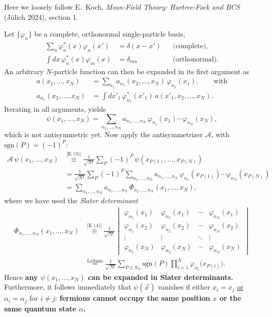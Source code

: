 \documentclass[../../main.tex]{subfiles}
\begin{document}
Here we loosely follow E.\ Koch, \emph{Mean-Field Theory: Hartree-Fock and BCS}
(J\"ulich 2024), section 1.

Let $\{\varphi_n\}$ be a complete, orthonormal single-particle basis,
\begin{align}
\sum_n \varphi_n^*(x)\varphi_n(x')&=\delta(x-x') &&\text{(complete)},\\
\int\! dx\, \varphi_n^*(x)\varphi_m(x)&=\delta_{nm} &&\text{(orthonormal)}.
\end{align}
An arbitrary $N$-particle function can then be expanded in its first argument as
\begin{align}
a(x_1,\dots,x_N)&=\sum_{n_1} a_{n_1}(x_2,\dots,x_N)\,\varphi_{n_1}(x_1),\qquad\text{with}\\
a_{n_1}(x_2,\dots,x_N)&=\int\! dx'_1\, \varphi^*_{n_1}(x'_1)\,a(x'_1,x_2,\dots,x_N).
\end{align}
Iterating in all arguments, yields
\begin{equation}
\psi(x_1,\dots,x_N)=\sum_{n_1,\dots,n_N} a_{n_1,\dots,n_N}\,
\varphi_{n_1}(x_1)\cdots\varphi_{n_N}(x_N),
\end{equation}
which is not antisymmetric yet.
Now apply the antisymmetrizer $\mathcal A$, with $\mathrm{sgn}(P)=(-1)^P$:
\begin{align}
\mathcal A\,\psi(x_1,\dots,x_N)
&\overset{\text{[K~(3)]}}{\equiv}  \frac{1}{\sqrt{N!}}\sum_P (-1)^P\,\psi(x_{P(1)},\dots,x_{P(N)})\\
&=\frac{1}{\sqrt{N!}}\sum_P (-1)^P \sum_{n_1,\dots,n_N} a_{n_1,\dots,n_N}\,
\varphi_{n_1}(x_{P(1)})\cdots\varphi_{n_N}(x_{P(N)})\\
&=\sum_{n_1,\dots,n_N} a_{n_1,\dots,n_N}\,\Phi_{n_1,\dots,n_N}(x_1,\dots,x_N),
\end{align}
where we have used the \emph{Slater determinant}
\begin{align}
\Phi_{\alpha_1,\dots,\alpha_N}(x_1,\dots,x_N)
&\overset{\text{[K~(4)]}}{\equiv} \frac{1}{\sqrt{N!}}
\begin{vmatrix}
\varphi_{\alpha_1}(x_1) & \varphi_{\alpha_2}(x_1) & \cdots & \varphi_{\alpha_N}(x_1)\\
\varphi_{\alpha_1}(x_2) & \varphi_{\alpha_2}(x_2) & \cdots & \varphi_{\alpha_N}(x_2)\\
\vdots & \vdots & \ddots & \vdots\\
\varphi_{\alpha_1}(x_N) & \varphi_{\alpha_2}(x_N) & \cdots & \varphi_{\alpha_N}(x_N)
\end{vmatrix}\\
&\overset{\text{Leibniz}}{=}\frac{1}{\sqrt{N!}}\sum_{P\in S_N}
\mathrm{sgn}(P)\prod_{i=1}^{N}\varphi_{\alpha_i}\big(x_{P(i)}\big).
\end{align}
Hence \textbf{any $\psi(x_1,\dots,x_N)$ can be expanded in Slater determinants.}
Furthermore, it follows immediately that $\psi(\vec x)$ vanishes if either
$x_i=x_j$ \underline{or} $\alpha_i=\alpha_j$ for $i\neq j$:
\textbf{fermions cannot occupy the same position $x$ or the same quantum state
$\alpha$.}
\end{document}
